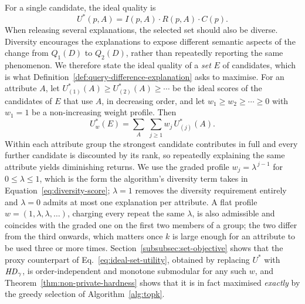 For a single candidate, the ideal quality is
\[
U^*(p,A)
=
I(p,A) \cdot R(p,A) \cdot C(p).
\]
When releasing several explanations, the selected set should also be diverse.
Diversity encourages the explanations to expose different semantic aspects of the change from $Q_1(D)$ to $Q_2(D)$, rather than repeatedly reporting the same phenomenon.
We therefore state the ideal quality of a \emph{set} $E$ of candidates, which is what Definition~\ref{def:query-difference-explanation} asks to maximise.
For an attribute $A$, let $U^*_{(1)}(A)\ge U^*_{(2)}(A)\ge\cdots$ be the ideal scores of the candidates of $E$ that use $A$, in decreasing order, and let $w_1\ge w_2\ge\cdots\ge0$ with $w_1=1$ be a non-increasing weight profile.
Then
\begin{equation}
U^*_w(E)=\sum_{A}\;\sum_{j\ge1} w_j\,U^*_{(j)}(A).
\label{eq:ideal-set-utility}
\end{equation}
Within each attribute group the strongest candidate contributes in full and every further candidate is discounted by its rank, so repeatedly explaining the same attribute yields diminishing returns.
We use the graded profile $w_j=\lambda^{\,j-1}$ for $0\le\lambda\le1$, which is the form the algorithm's diversity term takes in Equation~\eqref{eq:diversity-score}; $\lambda=1$ removes the diversity requirement entirely and $\lambda=0$ admits at most one explanation per attribute.
A flat profile $w=(1,\lambda,\lambda,\dots)$, charging every repeat the same $\lambda$, is also admissible and coincides with the graded one on the first two members of a group; the two differ from the third onwards, which matters once $k$ is large enough for an attribute to be used three or more times.
Section~\ref{subsubsec:set-objective} shows that the proxy counterpart of Eq.~\eqref{eq:ideal-set-utility}, obtained by replacing $U^*$ with $\mathit{HD}_\gamma$, is order-independent and monotone submodular for any such $w$, and Theorem~\ref{thm:non-private-hardness} shows that it is in fact maximised \emph{exactly} by the greedy selection of Algorithm~\ref{alg:topk}.

